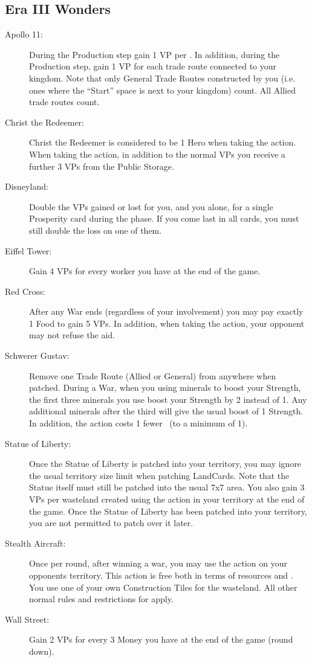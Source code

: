 \documentclass[10pt,twocolumn]{article}
\begin{document}
\begin{appendices}
\subsection{Era III Wonders}
\begin{description}
\item[Apollo 11:] During the Production step gain 1 VP per \tra. In addition, during the Production step, gain 1 VP for each trade route connected to your kingdom. Note that only General Trade Routes constructed by you (i.e. ones where the ``Start'' space is next to your kingdom) count. All Allied trade routes count.
\item[Christ the Redeemer:] Christ the Redeemer is considered to be 1 Hero when taking the  action. When taking the  action, in addition to the normal VPs you receive a further 3 VPs from the Public Storage.
\item[Disneyland:] Double the VPs gained or lost for you, and you alone, for a single Prosperity card during the  phase. If you come last in all cards, you must still double the loss on one of them.
\item[Eiffel Tower:] Gain 4 VPs for every worker you have at the end of the game.
\item[Red Cross:] After any War ends (regardless of your involvement) you may pay exactly 1 Food to gain 5 VPs. In addition, when taking the  action, your opponent may not refuse the aid.
\item[Schwerer Gustav:] Remove one Trade Route (Allied or General) from anywhere when patched. During a War, when you using minerals to boost your Strength, the first three minerals you use boost your Strength by 2 instead of 1. Any additional minerals after the third will give the usual boost of 1 Strength. In addition, the  action costs 1 fewer \polf\ (to a minimum of 1).
\item[Statue of Liberty:] Once the Statue of Liberty is patched into your territory, you may ignore the usual territory size limit when patching LandCards. Note that the Statue itself must still be patched into the usual 7x7 area. You also gain 3 VPs per wasteland created using the  action in your territory at the end of the game. Once the Statue of Liberty has been patched into your territory, you are not permitted to patch over it later.
\item[Stealth Aircraft:] Once per round, after winning a war, you may use the  action on your opponents territory. This action is free both in terms of resources and \polf. You use one of your own Construction Tiles for the wasteland. All other normal rules and restrictions for  apply.
\item[Wall Street:] Gain 2 VPs for every 3 Money you have at the end of the game (round down).
\end{description}

\end{appendices}
\end{document}
